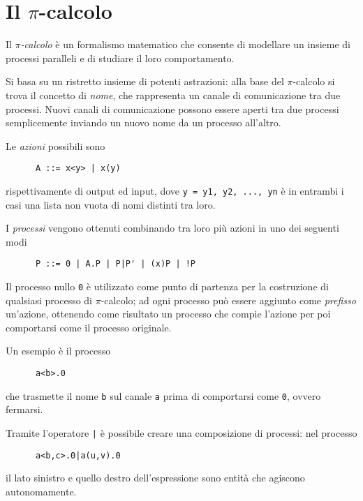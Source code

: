 \section{Il \texorpdfstring{$\pi$}{pi}-calcolo}

Il \emph{$\pi$-calcolo} \`e un formalismo matematico che consente di
modellare un insieme di processi paralleli e di studiare il loro
comportamento.

Si basa su un ristretto insieme di potenti astrazioni: alla base del
$\pi$-calcolo si trova il concetto di \emph{nome}, che rappresenta un
canale di comunicazione tra due processi. Nuovi canali di comunicazione
possono essere aperti tra due processi semplicemente inviando un nuovo
nome da un processo all'altro.

Le \emph{azioni} possibili sono

\begin{verbatim}
      A ::= x<y> | x(y)
\end{verbatim}

rispettivamente di output ed input, dove \verb!y = y1, y2, ..., yn! \`e
in entrambi i casi una lista non vuota di nomi distinti tra loro.

I \emph{processi} vengono ottenuti combinando tra loro pi\`u azioni in uno
dei seguenti modi

\begin{verbatim}
      P ::= 0 | A.P | P|P' | (x)P | !P
\end{verbatim}

Il processo nullo \verb.0. \`e utilizzato come punto di partenza per la
costruzione di qualsiasi processo di $\pi$-calcolo; ad ogni processo pu\`o
essere aggiunto come \emph{prefisso} un'azione, ottenendo come risultato un
processo che compie l'azione per poi comportarsi come il processo originale.

Un esempio \`e il processo

\begin{verbatim}
      a<b>.0
\end{verbatim}

che trasmette il nome \verb.b. sul canale \verb.a. prima di comportarsi come
\verb!0!, ovvero fermarsi.

Tramite l'operatore \verb.|. \`e possibile creare una composizione di
processi: nel processo

\begin{verbatim}
      a<b,c>.0|a(u,v).0
\end{verbatim}

il lato sinistro e quello destro dell'espressione sono entit\`a che agiscono
autonomamente.

